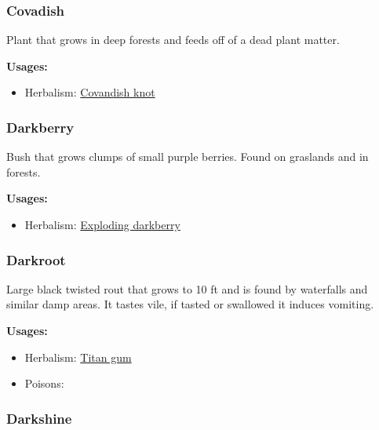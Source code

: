 \subsubsection{Covadish}
\label{Covadish}

Plant that grows in deep forests and feeds off of a dead plant matter.

\vspace{5mm}

\textbf{Usages:}

\begin{itemize}[noitemsep]
\item[] Herbalism: \hyperref[Covandish knot]{Covandish knot}
\end{itemize}

\subsubsection{Darkberry}
\label{Darkberry}

Bush that grows clumps of small purple berries. Found on graslands and in forests.

\vspace{5mm}

\textbf{Usages:}

\begin{itemize}[noitemsep]
\item[] Herbalism: \hyperref[Exploding darkberry]{Exploding darkberry}
\end{itemize}

\subsubsection{Darkroot}
\label{Darkroot}

Large black twisted rout that grows to 10 ft and is found by waterfalls and similar damp areas. It tastes vile, if tasted or swallowed it induces vomiting.

\vspace{5mm}

\textbf{Usages:}

\begin{itemize}[noitemsep]
\item[] Herbalism: \hyperref[Titan gum]{Titan gum}
\item[] Poisons: \poison
\end{itemize}

\subsubsection{Darkshine}
\label{Darkshine}

